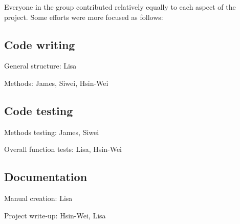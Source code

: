 \documentclass[11pt, oneside]{article}   	%
\begin{document}
Everyone in the group contributed relatively equally to each aspect of the project.  Some efforts were more focused as follows:

\subsection*{Code writing}

General structure: Lisa

Methods: James, Siwei, Hsin-Wei

\subsection*{Code testing}

Methods testing: James, Siwei

Overall function tests: Lisa, Hsin-Wei

\subsection*{Documentation} 

Manual creation: Lisa

Project write-up:  Hsin-Wei, Lisa
\end{document}
